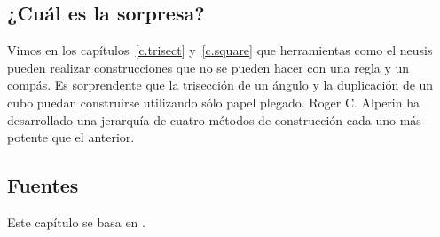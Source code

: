 \subsection*{¿Cuál es la sorpresa?}

Vimos en los capítulos~\ref{c.trisect} y~\ref{c.square} que herramientas como el neusis pueden realizar construcciones que no se pueden hacer con una regla y un compás. Es sorprendente que la trisección de un ángulo y la duplicación de un cubo puedan construirse utilizando sólo papel plegado. Roger C. Alperin ha desarrollado una jerarquía de cuatro métodos de construcción cada uno más potente que el anterior.

\subsection*{Fuentes}

Este capítulo se basa en \cite{alperin,lang,martin,newton}.
